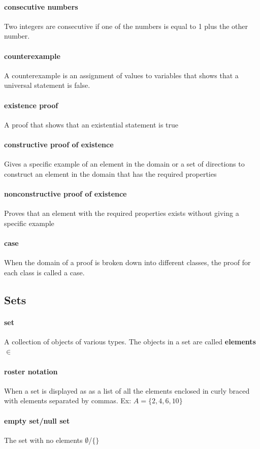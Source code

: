 \documentclass[a4paper]{article}
\begin{document}
\paragraph{consecutive numbers} Two integers are consecutive if one of the numbers is equal to 1 plus the other number.
\paragraph{counterexample} A counterexample is an assignment of values to variables that shows that a universal statement is false. 
\paragraph{existence proof} A proof that shows that an existential statement is true
\paragraph{constructive proof of existence}  Gives a specific example of an element in the domain or a set of directions to construct an element in the domain that has the required properties
\paragraph{nonconstructive proof of existence} Proves  that an element with the required properties exists without giving a specific example
\paragraph{case} When the domain of a proof is broken down into different classes, the proof for each class is called a case.

\pagebreak
\subsection{Sets}
\paragraph{set}A collection of objects of various types. The objects in a set are called \textbf{elements} $\in$
\paragraph{roster notation} When a set is displayed as as a list of all the elements enclosed in curly braced with elements separated by commas. Ex: $A = \{2, 4, 6, 10\}$
\paragraph{empty set/null set} The set with no elements $\emptyset$/$\{\}$
\end{document}
